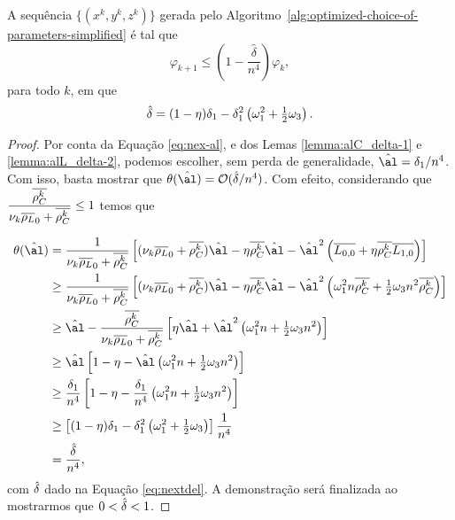 \begin{lema}\label{lemma:next-phi-delta-n4}
A sequência $\{(x^{k},y^{k},z^{k})\}$ gerada pelo Algoritmo~\ref{alg:optimized-choice-of-parameters-simplified} é tal que
\begin{equation}
		\label{eq:varphi-delta-n4}
				\varphi_{k+1}\leq \left(1 - \frac{\hat{\delta}}{n^{4}}\right)\varphi_{k},
	\end{equation}
	para todo $k$, em que 
	\begin{equation}
		\label{eq:nextdel}
		 \hat{\delta} =(1 -  \eta)\delta_{1} - \delta_{1}^{2}\left(\omega_1^{2} + \tfrac{1}{2}\omega_{3} \right).
	\end{equation}
\end{lema}


\begin{proof} Por conta da Equação \eqref{eq:nex-al}, e dos Lemas \ref{lemma:alC_delta-1} e \ref{lemma:alL_delta-2}, podemos escolher, sem perda de generalidade, $\nextal = \delta_{1}/n^{4}$. Com isso, basta mostrar que $\theta(\nextal)= \Oset(\nextdel/n^{4})$. Com efeito, considerando que $\dfrac{\overline{\rho_C^k }}{\nu_k\overline{\rho_L}_0 + \overline{\rho_C^k }}\leq 1$ temos que


\[
	\begin{aligned}
		\theta(\nextal)%
						& = \dfrac{1}{\nu_k\dbvec{\rho_L}_0 + \dbvec{\rho_C^k }}\left[ (\nu_k\dbvec{\rho_L}_0 + \dbvec{\rho_C^k })\nextal -  \eta\dbvec{\rho_C^k }\nextal - \nextal^{2}\left(\dbvec{L_{0,0}} + \eta\dbvec{\rho_C^k } \dbvec{L_{1,0}} \right) \right] \\
						& \geq \dfrac{1}{\nu_k\dbvec{\rho_L}_0 + \dbvec{\rho_C^k }}\left[ (\nu_k\dbvec{\rho_L}_0 + \dbvec{\rho_C^k })\nextal -  \eta\dbvec{\rho_C^k }\nextal - \nextal^{2}\left(\omega_1^{2} n\dbvec{\rho_C^k } + \tfrac{1}{2}\omega_{3}n^{2}\dbvec{\rho_C^k } \right) \right]\\
						& \geq \nextal - \dfrac{\dbvec{\rho_C^k }}{\nu_k\dbvec{\rho_L}_0 + \dbvec{\rho_C^k }} \left[   \eta\nextal + \nextal^{2}\left(\omega_1^{2} n + \tfrac{1}{2}\omega_{3}n^{2} \right) \right]\\
						& \geq \nextal \left[ 1 -  \eta - \nextal\left(\omega_1^{2} n + \tfrac{1}{2}\omega_{3}n^{2} \right) \right] \\
						& \geq \frac{\delta_{1}}{n^{4}} \left[ 1 -  \eta - \frac{\delta_{1}}{n^{4}}\left(\omega_1^{2} n + \tfrac{1}{2}\omega_{3}n^{2} \right) \right] \\
						& \geq 	 \left[ (1 -  \eta)\delta_{1} - \delta_{1}^{2}\left(\omega_1^{2} + \tfrac{1}{2}\omega_{3} \right) \right] \frac{1}{n^{4}}	\\
						& = \frac{\nextdel}{n^{4}},		
		\end{aligned}
	\]
	com 	$\hat{\delta}$ dado na Equação \eqref{eq:nextdel}. A demonstração será finalizada ao mostrarmos que $0<\hat{\delta}<1$.


\end{proof}
